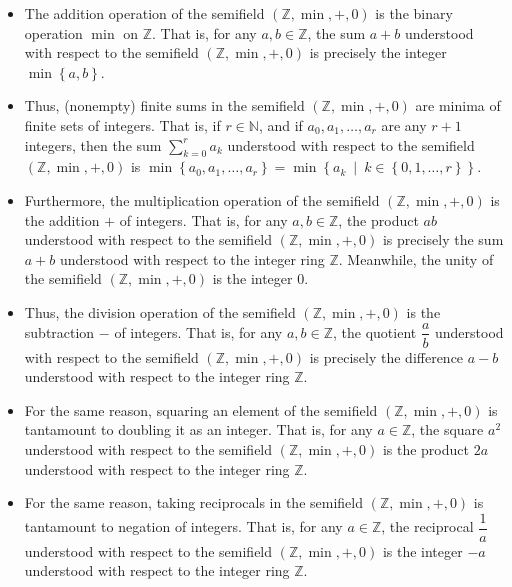 \documentclass[numbers=enddot,12pt,final,onecolumn,notitlepage]{scrartcl}%
\theoremstyle{definition}
\let\sumnonlimits\sum
\renewcommand{\sum}{\sumnonlimits\limits}
\begin{document}
\begin{itemize}
\item The addition operation of the semifield $\left(  \mathbb{Z}%
,\min,+,0\right)  $ is the binary operation $\min$ on $\mathbb{Z}$. That is,
for any $a,b\in\mathbb{Z}$, the sum $a+b$ understood with respect to the
semifield $\left(  \mathbb{Z},\min,+,0\right)  $ is precisely the integer
$\min\left\{  a,b\right\}  $.

\item Thus, (nonempty) finite sums in the semifield $\left(  \mathbb{Z}%
,\min,+,0\right)  $ are minima of finite sets of integers. That is, if
$r\in\mathbb{N}$, and if $a_{0},a_{1},\ldots,a_{r}$ are any $r+1$ integers,
then the sum $\sum_{k=0}^{r}a_{k}$ understood with respect to the semifield
$\left(  \mathbb{Z},\min,+,0\right)  $ is $\min\left\{  a_{0},a_{1}%
,\ldots,a_{r}\right\}  =\min\left\{  a_{k}\ \mid\ k\in\left\{  0,1,\ldots
,r\right\}  \right\}  $.

\item Furthermore, the multiplication operation of the semifield $\left(
\mathbb{Z},\min,+,0\right)  $ is the addition $+$ of integers. That is, for
any $a,b\in\mathbb{Z}$, the product $ab$ understood with respect to the
semifield $\left(  \mathbb{Z},\min,+,0\right)  $ is precisely the sum $a+b$
understood with respect to the integer ring $\mathbb{Z}$. Meanwhile, the unity
of the semifield $\left(  \mathbb{Z},\min,+,0\right)  $ is the integer $0$.

\item Thus, the division operation of the semifield $\left(  \mathbb{Z}%
,\min,+,0\right)  $ is the subtraction $-$ of integers. That is, for any
$a,b\in\mathbb{Z}$, the quotient $\dfrac{a}{b}$ understood with respect to the
semifield $\left(  \mathbb{Z},\min,+,0\right)  $ is precisely the difference
$a-b$ understood with respect to the integer ring $\mathbb{Z}$.

\item For the same reason, squaring an element of the semifield $\left(
\mathbb{Z},\min,+,0\right)  $ is tantamount to doubling it as an integer. That
is, for any $a\in\mathbb{Z}$, the square $a^{2}$ understood with respect to
the semifield $\left(  \mathbb{Z},\min,+,0\right)  $ is the product $2a$
understood with respect to the integer ring $\mathbb{Z}$.

\item For the same reason, taking reciprocals in the semifield $\left(
\mathbb{Z},\min,+,0\right)  $ is tantamount to negation of integers. That is,
for any $a\in\mathbb{Z}$, the reciprocal $\dfrac{1}{a}$ understood with
respect to the semifield $\left(  \mathbb{Z},\min,+,0\right)  $ is the integer
$-a$ understood with respect to the integer ring $\mathbb{Z}$.


\end{itemize}
\end{document}
